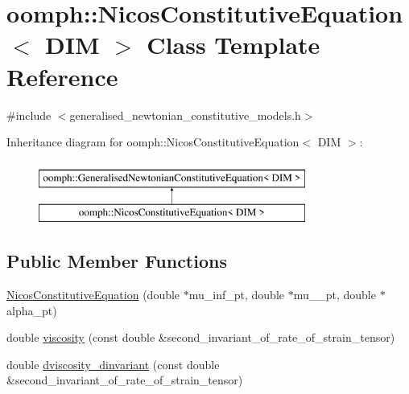 \hypertarget{classoomph_1_1NicosConstitutiveEquation}{}\section{oomph\+:\+:Nicos\+Constitutive\+Equation$<$ D\+IM $>$ Class Template Reference}
\label{classoomph_1_1NicosConstitutiveEquation}


{\ttfamily \#include $<$generalised\+\_\+newtonian\+\_\+constitutive\+\_\+models.\+h$>$}

Inheritance diagram for oomph\+:\+:Nicos\+Constitutive\+Equation$<$ D\+IM $>$\+:\begin{figure}[H]
\begin{center}
\leavevmode
\includegraphics[height=2.000000cm]{classoomph_1_1NicosConstitutiveEquation}
\end{center}
\end{figure}
\subsection*{Public Member Functions}
\begin{DoxyCompactItemize}
\item 
\hyperlink{classoomph_1_1NicosConstitutiveEquation_a5fcbd52036d1d075ce4e9a0515276a29}{Nicos\+Constitutive\+Equation} (double $\ast$mu\+\_\+inf\+\_\+pt, double $\ast$mu\+\_\+\_\+pt, double $\ast$alpha\+\_\+pt)
\item 
double \hyperlink{classoomph_1_1NicosConstitutiveEquation_a69afbe7d614474de9441a4ad3805ea05}{viscosity} (const double \&second\+\_\+invariant\+\_\+of\+\_\+rate\+\_\+of\+\_\+strain\+\_\+tensor)
\item 
double \hyperlink{classoomph_1_1NicosConstitutiveEquation_a470905abb0522dd441e1e32fbaabb9c3}{dviscosity\+\_\+dinvariant} (const double \&second\+\_\+invariant\+\_\+of\+\_\+rate\+\_\+of\+\_\+strain\+\_\+tensor)
\end{DoxyCompactItemize}

